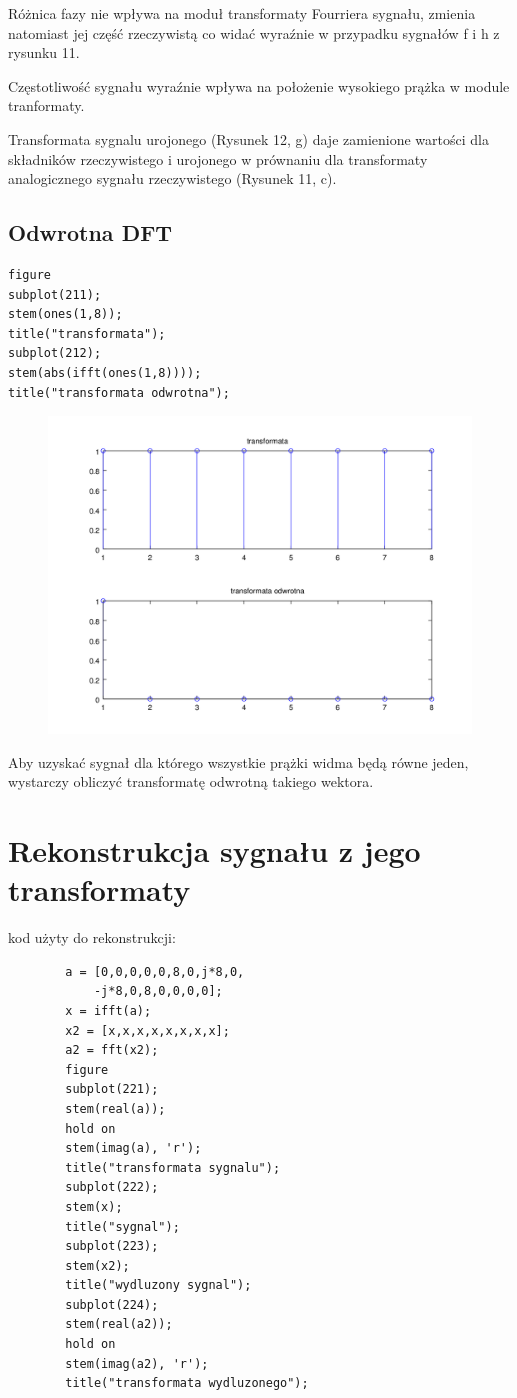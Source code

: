 \documentclass[12pt,titlepage]{report}
\begin{document}
Różnica fazy nie wpływa na moduł transformaty Fourriera sygnału, zmienia natomiast jej część rzeczywistą co widać wyraźnie w przypadku sygnałów f i h z rysunku 11.
\par
Częstotliwość sygnału wyraźnie wpływa na położenie wysokiego prążka w module tranformaty.
\par
Transformata sygnalu urojonego (Rysunek 12, g) daje zamienione wartości dla składników rzeczywistego i urojonego w prównaniu dla transformaty analogicznego sygnału rzeczywistego (Rysunek 11, c).
\newpage

\subsection{Odwrotna DFT}
{
\scriptsize
\begin{verbatim}
figure
subplot(211);
stem(ones(1,8));
title("transformata");
subplot(212);
stem(abs(ifft(ones(1,8))));
title("transformata odwrotna");
\end{verbatim}
}
\begin{figure}[!h]
	\centering
	\includegraphics[scale=0.6]{../cw22_output}
	\caption{}
\end{figure}
Aby uzyskać sygnał dla którego wszystkie prążki widma będą równe jeden, wystarczy obliczyć transformatę odwrotną takiego wektora.
\newpage

\section{Rekonstrukcja sygnału z jego transformaty}
kod użyty do rekonstrukcji:
\begin{multicols}{3}
	{
		\footnotesize
		\begin{verbatim}
		a = [0,0,0,0,0,8,0,j*8,0,
			-j*8,0,8,0,0,0,0];
		x = ifft(a);
		x2 = [x,x,x,x,x,x,x,x];
		a2 = fft(x2);
		figure
		subplot(221);
		stem(real(a));
		hold on
		stem(imag(a), 'r');
		title("transformata sygnalu");
		subplot(222);
		stem(x);
		title("sygnal");
		subplot(223);
		stem(x2);
		title("wydluzony sygnal");
		subplot(224);
		stem(real(a2));
		hold on
		stem(imag(a2), 'r');
		title("transformata wydluzonego");
		\end{verbatim}
	}
\end{multicols}
\end{document}
